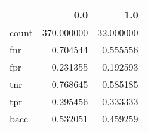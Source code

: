 \begin{tabular}{lrr}
\toprule
{} &         0.0 &        1.0 \\
\midrule
count &  370.000000 &  32.000000 \\
fnr   &    0.704544 &   0.555556 \\
fpr   &    0.231355 &   0.192593 \\
tnr   &    0.768645 &   0.585185 \\
tpr   &    0.295456 &   0.333333 \\
bacc  &    0.532051 &   0.459259 \\
\bottomrule
\end{tabular}
